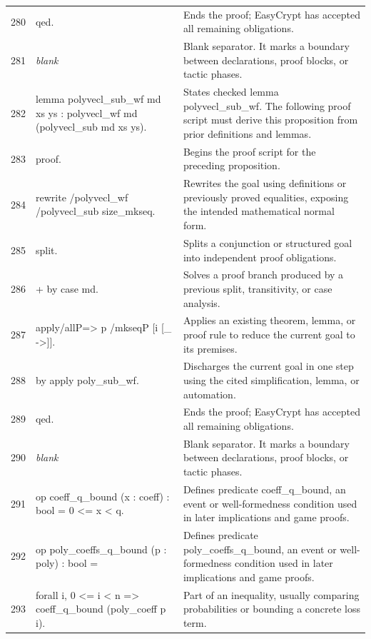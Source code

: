 \documentclass[10pt]{article}
\begin{document}
\begin{longtable}{r L{0.53\textwidth} L{0.37\textwidth}}
280 & {\ttfamily\scriptsize qed.} & Ends the proof; EasyCrypt has accepted all remaining obligations. \\
281 & {\ttfamily\scriptsize \emph{blank}} & Blank separator.  It marks a boundary between declarations, proof blocks, or tactic phases. \\
282 & {\ttfamily\scriptsize lemma polyvecl\_sub\_wf md xs ys : polyvecl\_wf md (polyvecl\_sub md xs ys).} & States checked lemma polyvecl\_sub\_wf.  The following proof script must derive this proposition from prior definitions and lemmas. \\
283 & {\ttfamily\scriptsize proof.} & Begins the proof script for the preceding proposition. \\
284 & {\ttfamily\scriptsize rewrite /polyvecl\_wf /polyvecl\_sub size\_mkseq.} & Rewrites the goal using definitions or previously proved equalities, exposing the intended mathematical normal form. \\
285 & {\ttfamily\scriptsize split.} & Splits a conjunction or structured goal into independent proof obligations. \\
286 & {\ttfamily\scriptsize + by case md.} & Solves a proof branch produced by a previous split, transitivity, or case analysis. \\
287 & {\ttfamily\scriptsize apply/allP=> p /mkseqP [i [\_ ->]].} & Applies an existing theorem, lemma, or proof rule to reduce the current goal to its premises. \\
288 & {\ttfamily\scriptsize by apply poly\_sub\_wf.} & Discharges the current goal in one step using the cited simplification, lemma, or automation. \\
289 & {\ttfamily\scriptsize qed.} & Ends the proof; EasyCrypt has accepted all remaining obligations. \\
290 & {\ttfamily\scriptsize \emph{blank}} & Blank separator.  It marks a boundary between declarations, proof blocks, or tactic phases. \\
291 & {\ttfamily\scriptsize op coeff\_q\_bound (x : coeff) : bool = 0 <= x < q.} & Defines predicate coeff\_q\_bound, an event or well-formedness condition used in later implications and game proofs. \\
292 & {\ttfamily\scriptsize op poly\_coeffs\_q\_bound (p : poly) : bool =} & Defines predicate poly\_coeffs\_q\_bound, an event or well-formedness condition used in later implications and game proofs. \\
293 & {\ttfamily\scriptsize   forall i, 0 <= i < n => coeff\_q\_bound (poly\_coeff p i).} & Part of an inequality, usually comparing probabilities or bounding a concrete loss term. \\

\end{longtable}
\end{document}
